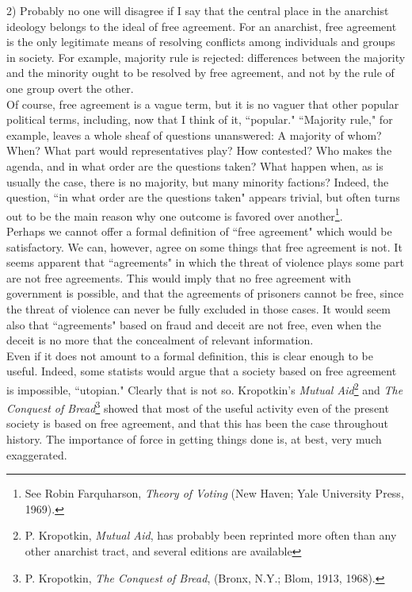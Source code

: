 2) Probably no one will disagree if I say that the central place in the anarchist ideology belongs to the ideal of free agreement. For an anarchist, free agreement is the only legitimate means of resolving conflicts among individuals and groups in society. For example, majority rule is rejected: differences between the majority and the minority ought to be resolved by free agreement, and not by the rule of one group overt the other.\\
Of course, free agreement is a vague term, but it is no vaguer that other popular political terms, including, now that I think of it, ``popular." ``Majority rule," for example, leaves a whole sheaf of questions unanswered: A majority of whom? When? What part would representatives play? How contested? Who makes the agenda, and in what order are the questions taken? What happen when, as is usually the case, there is no majority, but many minority factions? Indeed, the question, ``in what order are the questions taken" appears trivial, but often turns out to be the main reason why one outcome is favored over another\footnote{See Robin Farquharson, \emph{Theory of Voting} (New Haven; Yale University Press, 1969).}.\\
Perhaps we cannot offer a formal definition of ``free agreement" which would be satisfactory. We can, however, agree on some things that free agreement is not. It seems apparent that ``agreements" in which the threat of violence plays some part are not free agreements. This would imply that no free agreement with government is possible, and that the agreements of prisoners cannot be free, since the threat of violence can never be fully excluded in those cases. It would seem also that ``agreements" based on fraud and deceit are not free, even when the deceit is no more that the concealment of relevant information.\\
Even if it does not amount to a formal definition, this is clear enough to be useful. Indeed, some statists would argue that a society based on free agreement is impossible, ``utopian." Clearly that is not so. Kropotkin's \emph{Mutual Aid}\footnote{P. Kropotkin, \emph{Mutual Aid}, has probably been reprinted more often than any other anarchist tract, and several editions are available} and \emph{The Conquest of Bread}\footnote{P. Kropotkin, \emph{The Conquest of Bread}, (Bronx, N.Y.; Blom, 1913, 1968).} showed that most of the useful activity even of the present society is based on free agreement, and that this has been the case throughout history. The importance of force in getting things done is, at best, very much exaggerated.\\

